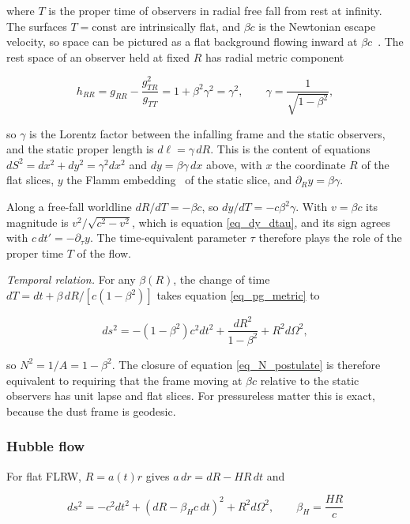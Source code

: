\documentclass[pdflatex,sn-mathphys-num]{sn-jnl}%
\theoremstyle{thmstyleone}%
\theoremstyle{thmstyletwo}%
\theoremstyle{thmstylethree}%
\begin{document}
where $T$ is the proper time of observers in radial free fall from rest at infinity. The surfaces $T=\text{const}$ are intrinsically flat, and $\beta c$ is the Newtonian escape velocity, so space can be pictured as a flat background flowing inward at $\beta c$~\cite{HamiltonLisle2008}. The rest space of an observer held at fixed $R$ has radial metric component

\begin{equation}
    h_{RR}=g_{RR}-\frac{g_{TR}^2}{g_{TT}}=1+\beta^2\gamma^2=\gamma^2,
    \qquad
    \gamma=\frac{1}{\sqrt{1-\beta^2}},
\end{equation}

so $\gamma$ is the Lorentz factor between the infalling frame and the static observers, and the static proper length is $d\ell=\gamma\,dR$. This is the content of equations $dS^2=dx^2+dy^2=\gamma^2dx^2$ and $dy=\beta\gamma\,dx$ above, with $x$ the coordinate $R$ of the flat slices, $y$ the Flamm embedding~\cite{Flamm1916} of the static slice, and $\partial_R y=\beta\gamma$.

Along a free-fall worldline $dR/dT=-\beta c$, so $dy/dT=-c\beta^2\gamma$. With $v=\beta c$ its magnitude is $v^2/\sqrt{c^2-v^2}$, which is equation \ref{eq_dy_dtau}, and its sign agrees with $c\,dt'=-\partial_\tau y$. The time-equivalent parameter $\tau$ therefore plays the role of the proper time $T$ of the flow.

\textit{Temporal relation.} For any $\beta(R)$, the change of time $dT=dt+\beta\,dR/\left[c(1-\beta^2)\right]$ takes equation \ref{eq_pg_metric} to

\begin{equation}
    ds^2=-(1-\beta^2)c^2dt^2+\frac{dR^2}{1-\beta^2}+R^2d\Omega^2 ,
\end{equation}

so $N^2=1/A=1-\beta^2$. The closure of equation \ref{eq_N_postulate} is therefore equivalent to requiring that the frame moving at $\beta c$ relative to the static observers has unit lapse and flat slices. For pressureless matter this is exact, because the dust frame is geodesic.

\subsubsection{Hubble flow}

For flat FLRW, $R=a(t)r$ gives $a\,dr=dR-HR\,dt$ and

\begin{equation}\label{eq_flrw_pg}
    ds^2=-c^2dt^2+\left(dR-\beta_H c\,dt\right)^2+R^2d\Omega^2,
    \qquad
    \beta_H=\frac{HR}{c}
\end{equation}
\end{document}
